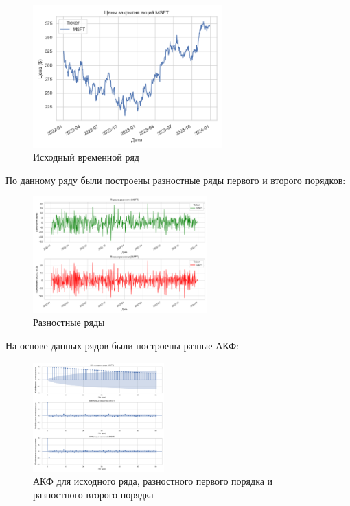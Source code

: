 \documentclass[a4paper, 12pt]{report}
\begin{document}
\begin{figure}[h]
    \centering
    \includegraphics[width=0.65\textwidth]{MSFT_original_series.png}
    \caption{Исходный временной ряд}
\end{figure} \par

По данному ряду были построены разностные ряды первого и второго порядков:

\begin{figure}[h]
    \centering
    \includegraphics[width=0.6\textwidth]{MSFT_differencing.png}
    \caption{Разностные ряды}
\end{figure} \par

На основе данных рядов были построены разные АКФ:

\begin{figure}[h]
    \centering
    \includegraphics[width=0.45\textwidth]{MSFT_acf_analysis.png}
    \caption{АКФ для исходного ряда, разностного первого порядка и разностного второго порядка}
\end{figure} \par
\end{document}

